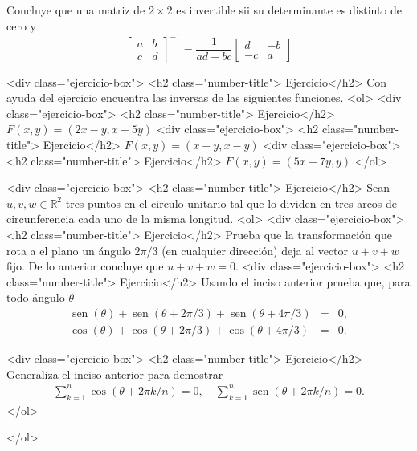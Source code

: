 \documentclass{article}
\theoremstyle{definition}
\newcommand{\sen}{\operatorname{sen}}
\begin{document}
	Concluye que una matriz de $2 \times 2$ es invertible sii su determinante es distinto de cero y
	$$
\left[
	\begin{array}{cc}
	a & b \\
	c & d
	\end{array}
	\right]^{-1} 
	=\frac{1}{ad-bc}\left[
	\begin{array}{cc}
	d & -b \\
	-c & a
	\end{array}
	\right]
	$$
	
	
	<div class="ejercicio-box"> <h2 class="number-title"> Ejercicio</h2> Con ayuda del ejercicio encuentra las inversas de las siguientes funciones.
	<ol>
	<div class="ejercicio-box"> <h2 class="number-title"> Ejercicio</h2> $F(x,y)=(2x-y, x+5y)$
	<div class="ejercicio-box"> <h2 class="number-title"> Ejercicio</h2> $F(x,y)=(x+y, x-y)$
	<div class="ejercicio-box"> <h2 class="number-title"> Ejercicio</h2> $F(x,y)=(5x+7y, y)$
	</ol>			
	
	
     <div class="ejercicio-box"> <h2 class="number-title"> Ejercicio</h2> Sean $u,v, w \in \mathbb{R}^2$ tres
       puntos en el circulo unitario tal que lo dividen en tres arcos de circunferencia cada uno de la misma longitud.
       <ol>
       <div class="ejercicio-box"> <h2 class="number-title"> Ejercicio</h2> Prueba que la transformación que rota a el plano un ángulo $2\pi/3$ (en cualquier dirección)
         deja al vector $u+v+w$ fijo. De lo anterior concluye que $u+v+w=0$.
       <div class="ejercicio-box"> <h2 class="number-title"> Ejercicio</h2> Usando el inciso anterior prueba que, para todo ángulo $\theta$
         \begin{eqnarray*}
         \sen(\theta)+\sen(\theta+2\pi/3)+\sen(\theta+4\pi/3)&=&0, \\
         \cos(\theta)+\cos(\theta+2\pi/3)+\cos(\theta+4\pi/3)&=&0 .
         \end{eqnarray*}

       <div class="ejercicio-box"> <h2 class="number-title"> Ejercicio</h2> Generaliza el inciso anterior para demostrar
         \begin{eqnarray*}
           \sum_{k=1}^n \cos(\theta+ 2\pi k/n)=0, \quad  \sum_{k=1}^n \sen(\theta +2\pi k /n)=0.
         \end{eqnarray*}
       </ol>



  </ol>

  
       
\end{document}

